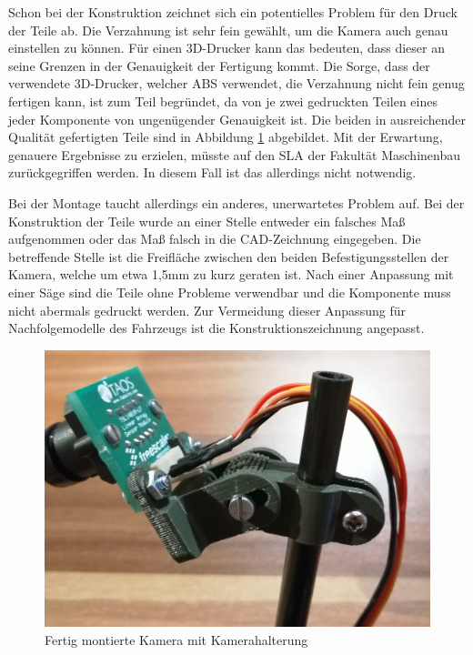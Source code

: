 Schon bei der Konstruktion zeichnet sich ein potentielles Problem für den Druck der Teile ab. Die Verzahnung ist sehr fein gewählt, um die Kamera auch genau einstellen zu können. Für einen 3D-Drucker kann das bedeuten, dass dieser an seine Grenzen in der Genauigkeit der Fertigung kommt. Die Sorge, dass der verwendete 3D-Drucker, welcher \ac{ABS} verwendet, die Verzahnung nicht fein genug fertigen kann, ist zum Teil begründet, da von je zwei gedruckten Teilen eines jeder Komponente von ungenügender Genauigkeit ist. Die beiden in ausreichender Qualität gefertigten Teile sind in Abbildung \ref{fig:KameraHalterungMontage} abgebildet. Mit der Erwartung, genauere Ergebnisse zu erzielen, müsste auf den \ac{SLA} der Fakultät Maschinenbau zurückgegriffen werden. In diesem Fall ist das allerdings nicht notwendig.\vspace{11pt}

Bei der Montage taucht allerdings ein anderes, unerwartetes Problem auf. Bei der Konstruktion der Teile wurde an einer Stelle entweder ein falsches Maß aufgenommen oder das Maß falsch in die CAD-Zeichnung eingegeben. Die betreffende Stelle ist die Freifläche zwischen den beiden Befestigungsstellen der Kamera, welche um etwa 1,5mm zu kurz geraten ist. Nach einer Anpassung mit einer Säge sind die Teile ohne Probleme verwendbar und die Komponente muss nicht abermals gedruckt werden. Zur Vermeidung dieser Anpassung für Nachfolgemodelle des Fahrzeugs ist die Konstruktionszeichnung angepasst.

\begin{figure}[H] %
\includegraphics[width=.70\textwidth]{sec2/images/3DAnbaukomponenten/Montagebilder/KameraHalterungMontage} 
\centering
\captionsetup{width=.9\textwidth}
\caption[Fertig montierte Kamera mit Kamerahalterung]{Fertig montierte Kamera mit Kamerahalterung}
\centering
\label{fig:KameraHalterungMontage}
\end{figure}


